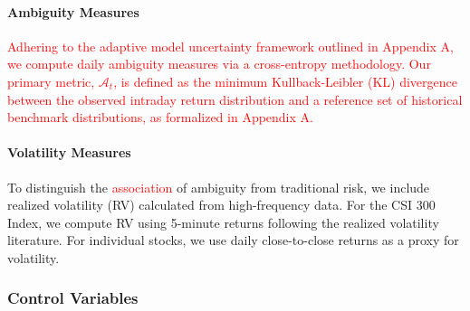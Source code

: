 \documentclass[preprint,12pt,authoryear]{elsarticle}
\begin{document}
\paragraph{Ambiguity Measures}
\textcolor{red}{Adhering to the adaptive model uncertainty framework outlined in Appendix A, we compute daily ambiguity measures via a cross-entropy methodology. Our primary metric, $\mathcal{A}_t$, is defined as the minimum Kullback-Leibler (KL) divergence between the observed intraday return distribution and a reference set of historical benchmark distributions, as formalized in Appendix A.}


\paragraph{Volatility Measures}
To distinguish the \textcolor{red}{association} of ambiguity from traditional risk, we include realized volatility (RV) calculated from high-frequency data. For the CSI 300 Index, we compute RV using 5-minute returns following the realized volatility literature. For individual stocks, we use daily close-to-close returns as a proxy for volatility.

\subsubsection{Control Variables}
\end{document}
